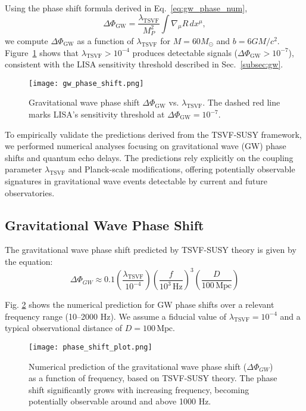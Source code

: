 \documentclass[12pt, onecolumn]{article}
\theoremstyle{definition}
\newcommand{\tsvf}{\lambda_{\mathrm{TSVF}}}
\numberwithin{equation}{section}
\begin{document}
Using the phase shift formula derived in Eq.~\eqref{eq:gw_phase_num},  
\begin{equation}
\Delta\Phi_{\mathrm{GW}} = \frac{\tsvf}{M_P^2} \int \nabla_\mu R \, dx^\mu,  
\label{eq:gw_phase_num}  
\end{equation}  
we compute \(\Delta\Phi_{\mathrm{GW}}\) as a function of \(\tsvf\) for \(M = 60M_\odot\) and \(b = 6GM/c^2\).  
Figure~\ref{fig:gw_phase} shows that \(\tsvf > 10^{-4}\) produces detectable signals (\(\Delta\Phi_{\mathrm{GW}} > 10^{-7}\)), consistent with the LISA sensitivity threshold described in Sec.~\ref{subsec:gw}.  

\begin{figure}[htbp]  
\centering  
\texttt{[image: gw\_phase\_shift.png]}  
\caption{Gravitational wave phase shift \(\Delta\Phi_{\mathrm{GW}}\) vs. \(\tsvf\).  
The dashed red line marks LISA's sensitivity threshold at \(\Delta\Phi_{\mathrm{GW}} = 10^{-7}\).}  
\label{fig:gw_phase}  
\end{figure}  

To empirically validate the predictions derived from the TSVF-SUSY framework, we performed numerical analyses focusing on gravitational wave (GW) phase shifts and quantum echo delays. The predictions rely explicitly on the coupling parameter $\lambda_{\text{TSVF}}$ and Planck-scale modifications, offering potentially observable signatures in gravitational wave events detectable by current and future observatories.

\subsection{Gravitational Wave Phase Shift}\label{subsec:gw_phase_shift}

The gravitational wave phase shift predicted by TSVF-SUSY theory is given by the equation:
\begin{equation}\label{eq:phase_shift}
\Delta \Phi_{GW} \approx 0.1 \left(\frac{\lambda_{\text{TSVF}}}{10^{-4}}\right) \left(\frac{f}{10^{3}\,\text{Hz}}\right)^3 \left(\frac{D}{100\,\text{Mpc}}\right)
\end{equation}

Fig. \ref{fig:phase_shift} shows the numerical prediction for GW phase shifts over a relevant frequency range (10--2000 Hz). We assume a fiducial value of $\lambda_{\text{TSVF}} = 10^{-4}$ and a typical observational distance of $D=100\,\text{Mpc}$.

\begin{figure}[htbp]
\centering
\texttt{[image: phase\_shift\_plot.png]}
\caption{Numerical prediction of the gravitational wave phase shift ($\Delta \Phi_{GW}$) as a function of frequency, based on TSVF-SUSY theory. The phase shift significantly grows with increasing frequency, becoming potentially observable around and above 1000 Hz.}
\label{fig:phase_shift}
\end{figure}
\end{document}
